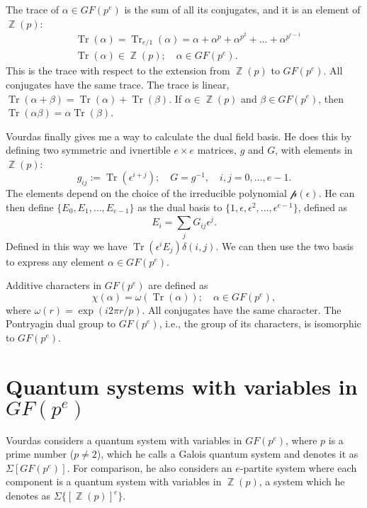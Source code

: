 \documentclass[a4paper]{article}
\DeclareMathOperator{\Z}{\mathbb{Z}}
\DeclareMathOperator{\Tr}{Tr}
\begin{document}
  The trace of $\alpha \in GF(p^{e})$ is the sum of all its
  conjugates, and it is an element of $\Z(p)$:
  \begin{align*}
    &\Tr(\alpha) = \Tr_{e / 1}(\alpha) = \alpha + \alpha^{p}
    + \alpha^{p^2} + \ldots + \alpha^{p^{e-1}} \\
    &\Tr(\alpha) \in \Z(p); \quad \alpha \in GF(p^{e}).
  \end{align*}
  This is the trace with respect to the extension from
  $\Z(p)$ to $GF(p^{e})$. All conjugates have the same
  trace. The trace is linear, $\Tr(\alpha+\beta) =
  \Tr(\alpha)+\Tr(\beta)$. If $\alpha \in \Z(p)$ and $\beta
  \in GF(p^{e})$, then $\Tr(\alpha\beta) = \alpha
  \Tr(\beta)$.

  Vourdas finally gives me a way to calculate the dual field
  basis. He does this by defining two symmetric and
  ivnertible $e \times e$ matrices, $g$ and $G$, with
  elements in $\Z(p)$:
  \[
    g_{ij} := \Tr\left( \epsilon^{i+j} \right);
    \quad
    G = g^{-1},
    \quad
    i,j = 0,\ldots,e-1.
  \] 
  The elements depend on the choice of the irreducible
  polynomial $\mathcal{p}(\epsilon)$. He can then define
  $\{E_0,E_1,\ldots,E_{e-1}\}$ as the dual basis to
  $\{1,\epsilon,\epsilon^2,\ldots,\epsilon^{e-1}\}$, defined
  as
  \[
    E_i = \sum_{j}^{} G_{ij} \epsilon^{j}.
  \] 
  Defined in this way we have $\Tr(\epsilon^{i} E_j)
  \delta(i,j)$. We can then use the two basis to express any
  element $\alpha \in GF(p^{e})$.

  Additive characters in $GF(p^{e})$ are defined as
  \[
    \chi(\alpha) = \omega\left( \Tr(\alpha) \right);
    \quad
    \alpha \in GF(p^{e}),
  \] 
  where $\omega(r) = \exp\left( i 2\pi r / p \right)$. All
  conjugates have the same character. The Pontryagin dual
  group to $GF(p^{e})$, i.e., the group of its characters,
  is isomorphic to $GF(p^{e})$.

  \section{Quantum systems with variables in $GF(p^{e})$}

  Vourdas considers a quantum system with variables in
  $GF(p^{e})$, where $p$ is a prime number ($p \neq 2$),
  which he calls a Galois quantum system and denotes it as
  $\Sigma[GF(p^{e})]$. For comparison, he also considers an
  $e$-partite system where each component is a quantum
  system with variables in $\Z(p)$, a system which he
  denotes as $\Sigma \{[\Z(p)]^{e}\}$.
\end{document}
